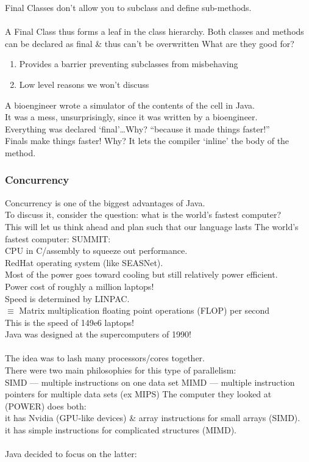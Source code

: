 \documentclass[../../lecture_notes.tex]{subfiles}
\begin{document}
\indent Final Classes don’t allow you to subclass and define sub-methods.\\
\\
A Final Class thus forms a leaf in the class hierarchy.
Both classes and methods can be declared as final \& thus can’t be overwritten
What are they good for?
\begin{enumerate} [itemsep=0mm]
	\item Provides a barrier preventing subclasses from misbehaving
	\item Low level reasons we won’t discuss
\end{enumerate}
A bioengineer wrote a simulator of the contents of the cell in Java.\\
It was a mess, unsurprisingly, since it was written by a bioengineer.\\
Everything was declared ‘final’…Why? “because it made things faster!”\\
Finals make things faster! Why? It lets the compiler ‘inline’ the body of the method.\\

\subsubsection*{Concurrency}
Concurrency is one of the biggest advantages of Java.\\
To discuss it, consider the question: what is the world’s fastest computer?\\
\indent This will let us think ahead and plan such that our language lasts
The world’s fastest computer: SUMMIT:\\
	\indent CPU in C/assembly to squeeze out performance.\\
	\indent RedHat operating system (like SEASNet).\\
	\indent Most of the power goes toward cooling but still relatively power efficient.\\
	\indent Power cost of roughly a million laptops!\\
	\indent Speed is determined by LINPAC.\\
		\indent \indent $\equiv$ Matrix multiplication floating point operations (FLOP) per second\\
	\indent This is the speed of 149e6 laptops!\\
Java was designed at the supercomputers of 1990!\\
\\
The idea was to lash many processors/cores together.\\
There were two main philosophies for this type of parallelism:\\
	\indent SIMD — multiple instructions on one data set
	\indent MIMD — multiple instruction pointers for multiple data sets (ex MIPS)
The computer they looked at (POWER) does both:\\
	\indent it has Nvidia (GPU-like devices) \& array instructions for small arrays (SIMD).\\
	\indent it has simple instructions for complicated structures (MIMD).\\
\\
Java decided to focus on the latter:
\end{document}

